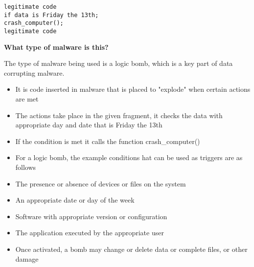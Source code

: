 \documentclass[../CIT288SecurityResearchNotebook.tex]{subfiles}
\begin{document}
\clearpage

\begin{mdframed}
\begin{verbatim}
legitimate code
if data is Friday the 13th;
crash_computer();
legitimate code
\end{verbatim}
\end{mdframed}
{\bf{What type of malware is this?}}


\noindent The type of malware being used is a logic bomb, which is a key part of data corrupting malware.
\begin{itemize}
\item{It is code inserted in malware that is placed to "explode" when certain actions are met} 
\item{The actions take place in the given fragment, it checks the data with appropriate day and date that is Friday the 13th} 
\item{If the condition is met it calls the function crash\_computer()} 
\item{For a logic bomb, the example conditions hat can be used as triggers are as follows} 
\item{The presence or absence of devices or files on the system} 
\item{An appropriate date or day of the week} 
\item{Software with appropriate version or configuration} 
\item{The application executed by the appropriate user} 
\item{Once activated, a bomb may change or delete data or complete files, or other damage} 
\end{itemize}

\end{document}

